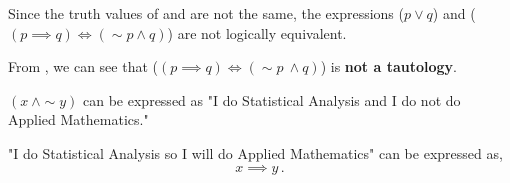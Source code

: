 \begin{subquestions}
\begin{subsubquestions}

\subsubquestion

\begin{subsubsubquestions}
	
\subsubsubquestion

Since the truth values of  and  are not the same, the expressions ($p \lor q$) and ($(p \implies q) \iff (\sim p \land q)$) are not logically equivalent.


\subsubsubquestion

From , we can see that ($(p \implies q) \iff (\sim p ~\land q)$) is \textbf{not a tautology}.

\end{subsubsubquestions}

\end{subsubquestions}


\subquestion

\begin{subsubquestions}
	
\subsubquestion

$(x ~\land \sim y)$ can be expressed as "I do Statistical Analysis and I do not do Applied Mathematics."

\subsubquestion

"I do Statistical Analysis so I will do Applied Mathematics" can be expressed as,
\begin{equation}
	x \implies y\,.
\end{equation}

\end{subsubquestions}


\subquestion


\end{subquestions}
